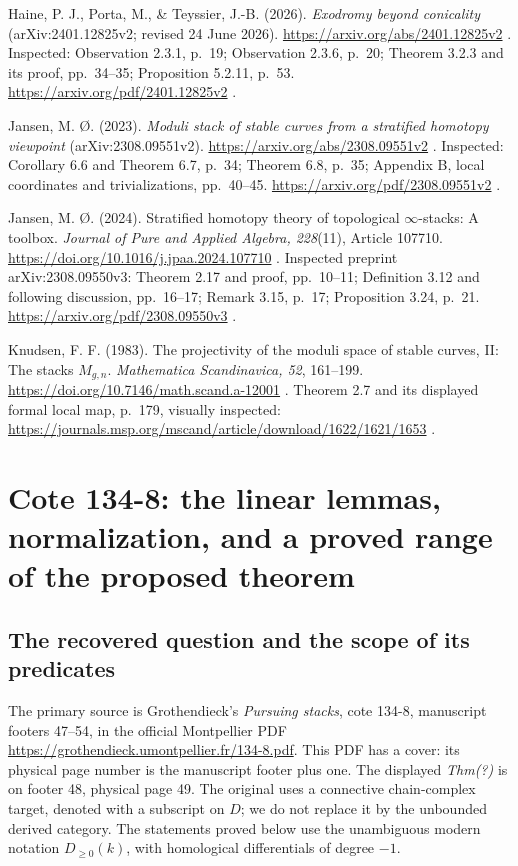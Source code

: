 \documentclass[11pt,a4paper]{article}
\theoremstyle{definition}\newtheorem{definition}[theorem]{Definition}
\theoremstyle{remark}\newtheorem{remark}[theorem]{Remark}
\begin{document}
Haine, P. J., Porta, M., \& Teyssier, J.-B. (2026). \emph{Exodromy
beyond conicality} (arXiv:2401.12825v2; revised 24 June 2026).
\url{https://arxiv.org/abs/2401.12825v2} . Inspected: Observation 2.3.1,
p.~19; Observation 2.3.6, p.~20; Theorem 3.2.3 and its proof,
pp.~34--35; Proposition 5.2.11, p.~53.
\url{https://arxiv.org/pdf/2401.12825v2} .

Jansen, M. Ø. (2023). \emph{Moduli stack of stable curves from a
stratified homotopy viewpoint} (arXiv:2308.09551v2).
\url{https://arxiv.org/abs/2308.09551v2} . Inspected: Corollary 6.6 and
Theorem 6.7, p.~34; Theorem 6.8, p.~35; Appendix B, local coordinates
and trivializations, pp.~40--45. \url{https://arxiv.org/pdf/2308.09551v2} .

Jansen, M. Ø. (2024). Stratified homotopy theory of topological
\(\infty\)-stacks: A toolbox. \emph{Journal of Pure and Applied Algebra,
228}(11), Article 107710. \url{https://doi.org/10.1016/j.jpaa.2024.107710} .
Inspected preprint arXiv:2308.09550v3: Theorem 2.17 and proof,
pp.~10--11; Definition 3.12 and following discussion, pp.~16--17; Remark
3.15, p.~17; Proposition 3.24, p.~21. \url{https://arxiv.org/pdf/2308.09550v3}
.

Knudsen, F. F. (1983). The projectivity of the moduli space of stable
curves, II: The stacks \(M_{g,n}\). \emph{Mathematica Scandinavica, 52},
161--199. \url{https://doi.org/10.7146/math.scand.a-12001} . Theorem 2.7 and
its displayed formal local map, p.~179, visually inspected:
\url{https://journals.msp.org/mscand/article/download/1622/1621/1653} .


\section{Cote 134-8: the linear lemmas, normalization, and a proved range of the proposed theorem}

\subsection{The recovered question and the scope of its predicates}
The primary source is Grothendieck's \emph{Pursuing stacks}, cote
134-8, manuscript footers 47--54, in the official Montpellier PDF
\url{https://grothendieck.umontpellier.fr/134-8.pdf}.  This PDF has a
cover: its physical page number is the manuscript footer plus one.
The displayed \emph{Thm(?)} is on footer 48, physical page 49.
The original uses a connective chain-complex target, denoted with a
subscript on \(D\); we do not replace it by the unbounded derived
category.  The statements proved below use the unambiguous modern
notation \(D_{\geq0}(k)\), with homological differentials of degree
\(-1\).
\end{document}
